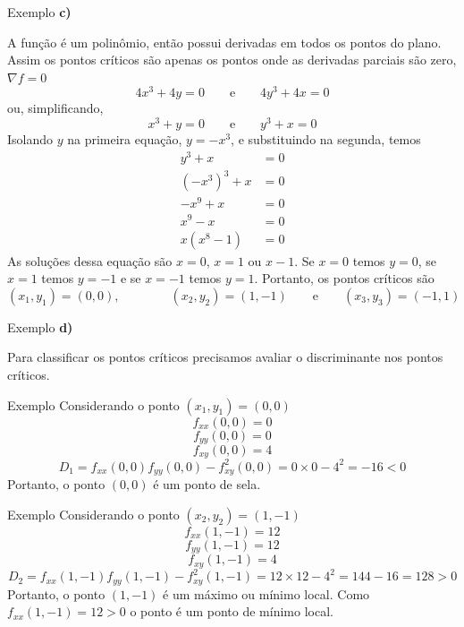 \begin{frame}{Exemplo \theexemplo}
  \noindent\textbf{c)}

  A função é um polinômio, então possui derivadas em todos os pontos do plano.
  Assim os pontos críticos são apenas os pontos onde as derivadas parciais são zero,
  \(\nabla f = 0\)
  \[
  4x^3 + 4y = 0
  \qquad\text{e}\qquad
  4y^3 + 4x = 0
  \]
  ou, simplificando,
  \[
  x^3 + y = 0
  \qquad\text{e}\qquad
  y^3 + x = 0
  \]
  Isolando $y$ na primeira equação, \(y = -x^3\), e substituindo na segunda, temos
  \begin{align*}
    y^3 + x                 & = 0 \\
    \left(-x^3\right)^3 + x & = 0 \\
    -x^9 + x                & = 0 \\
    x^9 - x                 & = 0 \\
    x(x^8 - 1)              & = 0
  \end{align*}
  As soluções dessa equação são $x=0$, $x=1$ ou $x-1$.
  Se $x=0$ temos $y=0$,
  se $x=1$ temos $y=-1$ e
  se $x=-1$ temos $y=1$.
  Portanto, os pontos críticos são
  \[
  (x_1, y_1) = (0, 0),
  \qquad\qquad
  (x_2, y_2) = (1, -1)
  \qquad\text{e}\qquad
  (x_3, y_3) = (-1, 1)
  \]
\end{frame}

\begin{frame}{Exemplo \theexemplo}
  \noindent\textbf{d)}

  Para classificar os pontos críticos precisamos avaliar o discriminante nos
  pontos críticos.
\end{frame}

\begin{frame}{Exemplo \theexemplo}
  Considerando o ponto \((x_1, y_1) = (0, 0)\)
  \[
  f_{xx}(0, 0) = 0
  \]
  \[
  f_{yy}(0, 0) = 0
  \]
  \[
  f_{xy}(0, 0) = 4
  \]
  \[
  D_1
  = f_{xx}(0, 0)f_{yy}(0, 0) - f^2_{xy}(0, 0)
  = 0 \times 0 - 4^2
  = -16 < 0
  \]
  Portanto, o ponto $(0, 0)$ é um ponto de sela.
\end{frame}

\begin{frame}{Exemplo \theexemplo}
  Considerando o ponto \((x_2, y_2) = (1, -1)\)
  \[
  f_{xx}(1, -1) = 12
  \]
  \[
  f_{yy}(1, -1) = 12
  \]
  \[
  f_{xy}(1, -1) = 4
  \]
  \[
  D_2
  = f_{xx}(1, -1)f_{yy}(1, -1) - f^2_{xy}(1, -1)
  = 12 \times 12 - 4^2
  = 144 -16
  = 128 > 0
  \]
  Portanto, o ponto $(1, -1)$ é um máximo ou mínimo local. Como \(f_{xx}(1, -1) = 12 > 0\)
  o ponto é um ponto de mínimo local.
\end{frame}

